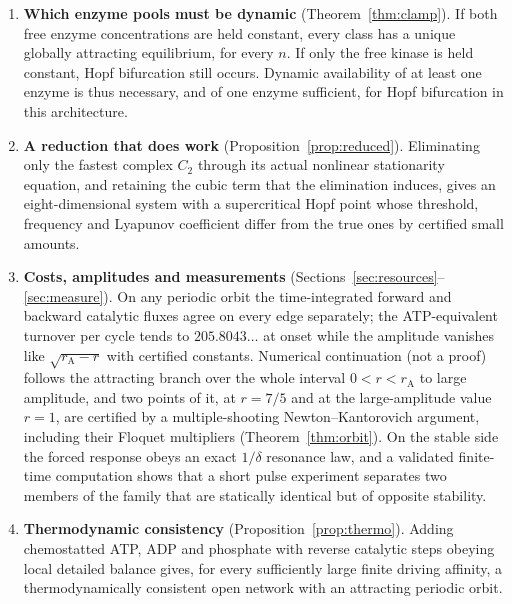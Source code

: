 \documentclass[11pt,a4paper]{article}
\theoremstyle{plain}
\theoremstyle{definition}
\theoremstyle{remark}
\newcommand{\rA}{r_{\mathrm A}}
\begin{document}
\begin{enumerate}[label=(\roman*),leftmargin=*]
\item \textbf{Which enzyme pools must be dynamic} (Theorem~\ref{thm:clamp}). If both free enzyme concentrations are held constant, every class has a unique globally attracting equilibrium, for every $n$. If only the free kinase is held constant, Hopf bifurcation still occurs. Dynamic availability of at least one enzyme is thus necessary, and of one enzyme sufficient, for Hopf bifurcation in this architecture.
\item \textbf{A reduction that does work} (Proposition~\ref{prop:reduced}). Eliminating only the fastest complex $C_2$ through its actual nonlinear stationarity equation, and retaining the cubic term that the elimination induces, gives an eight-dimensional system with a supercritical Hopf point whose threshold, frequency and Lyapunov coefficient differ from the true ones by certified small amounts.
\item \textbf{Costs, amplitudes and measurements} (Sections~\ref{sec:resources}--\ref{sec:measure}). On any periodic orbit the time-integrated forward and backward catalytic fluxes agree on every edge separately; the ATP-equivalent turnover per cycle tends to $205.8043\ldots$ at onset while the amplitude vanishes like $\sqrt{\rA-r}$ with certified constants. Numerical continuation (not a proof) follows the attracting branch over the whole interval $0<r<\rA$ to large amplitude, and two points of it, at $r=7/5$ and at the large-amplitude value $r=1$, are certified by a multiple-shooting Newton--Kantorovich argument, including their Floquet multipliers (Theorem~\ref{thm:orbit}). On the stable side the forced response obeys an exact $1/\delta$ resonance law, and a validated finite-time computation shows that a short pulse experiment separates two members of the family that are statically identical but of opposite stability.
\item \textbf{Thermodynamic consistency} (Proposition~\ref{prop:thermo}). Adding chemostatted ATP, ADP and phosphate with reverse catalytic steps obeying local detailed balance gives, for every sufficiently large finite driving affinity, a thermodynamically consistent open network with an attracting periodic orbit.
\end{enumerate}
\end{document}
